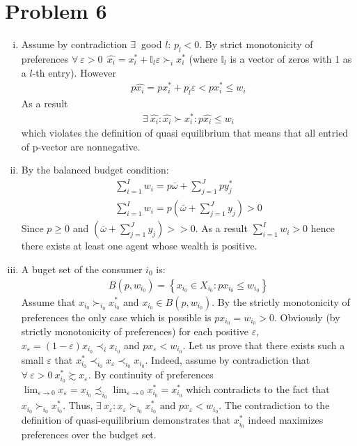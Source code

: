\documentclass[a4paper]{article}
\begin{document}
\section*{Problem 6}
\begin{enumerate}[(i)]
	\item Assume by contradiction $\exists\ $ good $l$: $p_l < 0$. By strict monotonicity of preferences $\forall\ \varepsilon >0\ \ \hat{x_i} = x_i^* + \mathbb{I}_l\varepsilon \succ_i x_i^*$ (where $\mathbb{I}_l$ is a vector of zeros with 1 as a $l$-th entry). However 
	\begin{align*}
	p\hat{x_i} = px_i^* + p_l\varepsilon < px_i^* \le w_i
	\end{align*}
	As a result 
	\begin{align*}
	\exists\ \hat{x_i}: \hat{x_i} \succ x_i^*: p\hat{x_i} \le w_i
	\end{align*}
	which violates the definition of quasi equilibrium that means that all entried of p-vector are nonnegative.
	\item By the balanced budget condition:
	\begin{align*}
	\sum_{i=1}^I w_i = p \bar{\omega} + \sum_{j=1}^J py_j^*\\
	\sum_{i=1}^I w_i = p \left(\bar{\omega} + \sum_{j=1}^J y_j\right) > 0
	\end{align*}
	Since $p \ge 0$ and $\left(\bar{\omega} + \sum_{j=1}^J y_j\right) >> 0$. As a result $\sum_{i=1}^I w_i > 0$ hence there exists at least one agent whose wealth is positive.
	\item A buget set of the consumer $i_0$ is:
	\begin{align*}
	B(p, w_{i_0}) = \left\{x_{i_0} \in X_{i_0}: px_{i_0} \le w_{i_0} \right\}
	\end{align*}
	Assume that $x_{i_0} \succ_{i_0} x^*_{i_0}$ and $x_{i_0} \in B(p, w_{i_0})$. By the strictly monotonicity of preferences the only case which is possible is $px_{i_0} = w_{i_0} > 0$. Obviously (by strictly monotonicity of preferences) for each positive $\varepsilon$, $x_{\varepsilon} = (1-\varepsilon)x_{i_0} \prec_i x_{i_0}$ and $px_{\varepsilon} < w_{i_0}$. Let us prove that there exists such a small $\varepsilon$ that $x_{i_0}^* \prec_{i_0} x_{\varepsilon} \prec_{i_0} x_{i_0}$. Indeed, assume by contradiction that $\forall\ \varepsilon > 0\ x_{i_0}^* \succsim x_{\varepsilon}$. By continuity of preferences $\lim_{\varepsilon \to 0} x_{\varepsilon} = x_{i_0} \precsim_{i_0} \lim_{\varepsilon \to 0} x_{i_0}^* = x_{i_0}^*$ which contradicts to the fact that $x_{i_0} \succ_{i_0} x_{i_0}^*$. Thus, $\exists\  x_{\varepsilon}: x_{\varepsilon} \succ_{i_0} x_{i_0}^*\text{ and } px_{\varepsilon} < w_{i_0}$. The contradiction to the definition of quasi-equilibrium demonstrates that $x_{i_0}^*$ indeed maximizes preferences over the budget set.

\end{enumerate}
\end{document}
